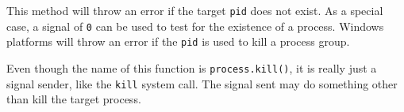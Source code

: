 This method will throw an error if the target \texttt{pid} does not
exist. As a special case, a signal of \texttt{0} can be used to test for
the existence of a process. Windows platforms will throw an error if the
\texttt{pid} is used to kill a process group.

Even though the name of this function is \texttt{process.kill()}, it is
really just a signal sender, like the \texttt{kill} system call. The
signal sent may do something other than kill the target process.

\begin{Shaded}
\begin{Highlighting}[]
 \OperatorTok{,} \OperatorTok{;}

\NormalTok{(}\OperatorTok{,}\NormalTok{ () }\KeywordTok{=\textgreater{}}\NormalTok{ \{}
  \NormalTok{(}\NormalTok{)}\OperatorTok{;}
\NormalTok{\})}\OperatorTok{;}

\NormalTok{(() }\KeywordTok{=\textgreater{}}\NormalTok{ \{}
  \NormalTok{(}\NormalTok{)}\OperatorTok{;}
  \NormalTok{(}\NormalTok{)}\OperatorTok{;}
\NormalTok{\}}\OperatorTok{,} \NormalTok{)}\OperatorTok{;}

\NormalTok{(}\OperatorTok{,} \NormalTok{)}\OperatorTok{;}
\end{Highlighting}
\end{Shaded}

